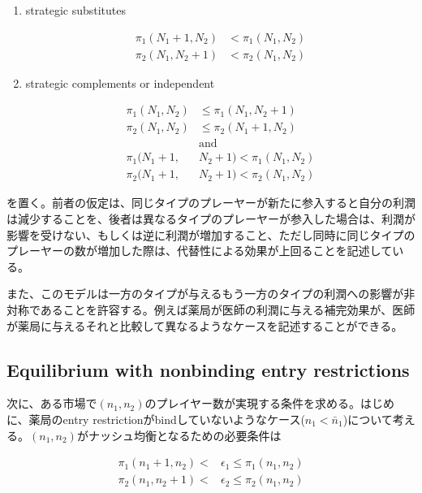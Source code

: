\documentclass[11pt]{jsarticle}
\begin{document}
\begin{enumerate}
  \item strategic substitutes

  \begin{align*}
    \pi_1(N_1 + 1, N_2) &< \pi_1(N_1, N_2) \\
    \pi_2(N_1, N_2 + 1) &< \pi_2(N_1, N_2)
  \end{align*}

  \item strategic complements or independent

  \begin{align*}
    \pi_1(N_1, N_2) &\leq \pi_1(N_1, N_2 + 1) \\
    \pi_2(N_1, N_2) &\leq \pi_2(N_1 + 1, N_2) \\
    & \text{and} \\
    \pi_1(N_1 + 1, & N_2 + 1) < \pi_1(N_1, N_2) \\
    \pi_2(N_1 + 1, & N_2 + 1) < \pi_2(N_1, N_2)
  \end{align*}

\end{enumerate}

を置く。前者の仮定は、同じタイプのプレーヤーが新たに参入すると自分の利潤は減少することを、後者は異なるタイプのプレーヤーが参入した場合は、利潤が影響を受けない、もしくは逆に利潤が増加すること、ただし同時に同じタイプのプレーヤーの数が増加した際は、代替性による効果が上回ることを記述している。

また、このモデルは一方のタイプが与えるもう一方のタイプの利潤への影響が非対称であることを許容する。例えば薬局が医師の利潤に与える補完効果が、医師が薬局に与えるそれと比較して異なるようなケースを記述することができる。

\subsection{Equilibrium with nonbinding entry restrictions}

次に、ある市場で$(n_1, n_2)$のプレイヤー数が実現する条件を求める。はじめに、薬局のentry restrictionがbindしていないようなケース($n_1 < \bar{n}_1$)について考える。$(n_1, n_2)$がナッシュ均衡となるための必要条件は

\begin{align*}
  \pi_1(n_1 + 1, n_2)<&\epsilon_1 \leq \pi_1(n_1, n_2) \\
  \pi_2(n_1, n_2 + 1) < & \epsilon_2 \leq \pi_2 (n_1, n_2)
\end{align*}
\end{document}
